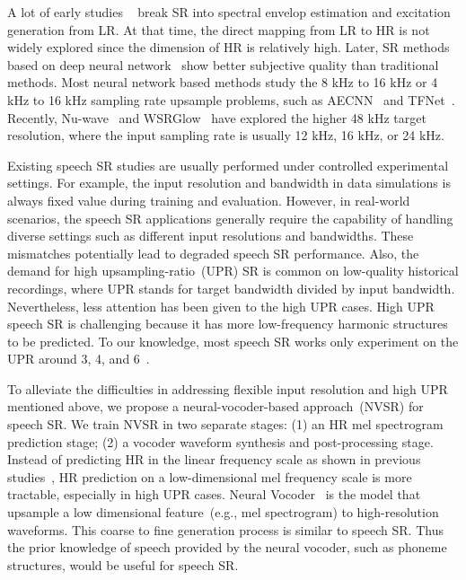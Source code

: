 \documentclass[a4paper]{article}
\begin{document}
A lot of early studies ~\cite{nakatoh2002generation-bwe-linear-mapping,kontio2007neural-network-bwe-2} break SR into spectral envelop estimation and excitation generation from LR. At that time, the direct mapping from LR to HR is not widely explored since the dimension of HR is relatively high. Later, SR methods based on deep neural network~\cite{li2015dnn-bwe,audio-supre-resolution-SR-kuleshov2017audio,gupta2019wavenet-bwe,eskimez2019speech} show better subjective quality than traditional methods. Most neural network based methods study the \num{8} kHz to \num{16} kHz or \num{4} kHz to \num{16} kHz sampling rate upsample problems, such as AECNN~\cite{heming-towards-sr-wang2021towards} and TFNet~\cite{tf-network-sr-lim2018time}. Recently, Nu-wave~\cite{nu-wave-lee2021nu} and WSRGlow~\cite{zhang2021wsrglow} have explored the higher \num{48} kHz target resolution, where the input sampling rate is usually \num{12} kHz, \num{16} kHz, or \num{24} kHz. 


Existing speech SR studies are usually performed under controlled experimental settings. For example, the input resolution and bandwidth in data simulations is always fixed value during training and evaluation.
However, in real-world scenarios, the speech SR applications generally require the capability of handling diverse settings such as different input resolutions and bandwidths. 
These mismatches potentially lead to degraded speech SR performance. Also, the demand for high upsampling-ratio~(UPR) SR is common on low-quality historical recordings, where UPR stands for target bandwidth divided by input bandwidth. Nevertheless, less attention has been given to the high UPR cases. High UPR speech SR is challenging because it has more low-frequency harmonic structures to be predicted. To our knowledge, most speech SR works only experiment on the UPR around \num{3}, \num{4}, and \num{6}~\cite{nu-wave-lee2021nu, zhang2021wsrglow, kim2021learning}. 









To alleviate the difficulties in addressing flexible input resolution and high UPR mentioned above, we propose a neural-vocoder-based approach~(NVSR) for speech SR. We train NVSR in two separate stages: (1) an HR mel spectrogram prediction stage; (2) a vocoder waveform synthesis and post-processing stage. Instead of predicting HR in the linear frequency scale as shown in previous studies~\cite{tf-network-sr-lim2018time,hu2020phase}, HR prediction on a low-dimensional mel frequency scale is more tractable, especially in high UPR cases. Neural Vocoder~\cite{hifi-gan-kong2020hifi, tian2020tfgan} is the model that upsample a low dimensional feature~(e.g., mel spectrogram) to high-resolution waveforms. This coarse to fine generation process is similar to speech SR. Thus the prior knowledge of speech provided by the neural vocoder, such as phoneme structures, would be useful for speech SR. 
\end{document}
